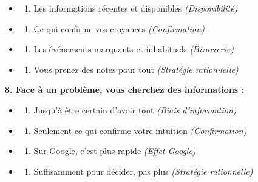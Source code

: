 \documentclass[
]{article}
\providecommand{\tightlist}{%
  \setlength{\itemsep}{0pt}\setlength{\parskip}{0pt}}
\begin{document}
\begin{itemize}
\tightlist
\item
  \begin{enumerate}
  \def\labelenumi{\alph{enumi})}
  \tightlist
  \item
    Les informations récentes et disponibles \emph{(Disponibilité)}
  \end{enumerate}
\item
  \begin{enumerate}
  \def\labelenumi{\alph{enumi})}
  \setcounter{enumi}{1}
  \tightlist
  \item
    Ce qui confirme vos croyances \emph{(Confirmation)}
  \end{enumerate}
\item
  \begin{enumerate}
  \def\labelenumi{\alph{enumi})}
  \setcounter{enumi}{2}
  \tightlist
  \item
    Les événements marquants et inhabituels \emph{(Bizarrerie)}
  \end{enumerate}
\item
  \begin{enumerate}
  \def\labelenumi{\alph{enumi})}
  \setcounter{enumi}{3}
  \tightlist
  \item
    Vous prenez des notes pour tout \emph{(Stratégie rationnelle)}
  \end{enumerate}
\end{itemize}

\textbf{8. Face à un problème, vous cherchez des informations :}

\begin{itemize}
\tightlist
\item
  \begin{enumerate}
  \def\labelenumi{\alph{enumi})}
  \tightlist
  \item
    Jusqu'à être certain d'avoir tout \emph{(Biais d'information)}
  \end{enumerate}
\item
  \begin{enumerate}
  \def\labelenumi{\alph{enumi})}
  \setcounter{enumi}{1}
  \tightlist
  \item
    Seulement ce qui confirme votre intuition \emph{(Confirmation)}
  \end{enumerate}
\item
  \begin{enumerate}
  \def\labelenumi{\alph{enumi})}
  \setcounter{enumi}{2}
  \tightlist
  \item
    Sur Google, c'est plus rapide \emph{(Effet Google)}
  \end{enumerate}
\item
  \begin{enumerate}
  \def\labelenumi{\alph{enumi})}
  \setcounter{enumi}{3}
  \tightlist
  \item
    Suffisamment pour décider, pas plus \emph{(Stratégie rationnelle)}
  \end{enumerate}
\end{itemize}
\end{document}
